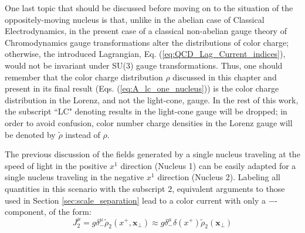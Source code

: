 One last topic that should be discussed before moving on to the situation of the oppositely-moving nucleus is that, unlike in the abelian case of Classical Electrodynamics, in the present case of a classical non-abelian gauge theory of Chromodynamics gauge transformations alter the distributions of color charge; otherwise, the introduced Lagrangian, Eq. (\ref{eq:QCD_Lag_Current_indices}), would not be invariant under SU(3) gauge transformations. Thus, one should remember that the color charge distribution $\rho$ discussed in this chapter and present in its final result (Eqs. (\ref{eq:A_lc_one_nucleus})) is the color charge distribution in the Lorenz, and not the light-cone, gauge. In the rest of this work, the subscript ``LC" denoting results in the light-cone gauge will be dropped; in order to avoid confusion, color number charge densities in the Lorenz gauge will be denoted by $\tilde{\rho}$ instead of $\rho$.

\bigskip
The previous discussion of the fields generated by a single nucleus traveling at the speed of light in the positive $x^1$ direction (Nucleus 1) can be easily adapted for a single nucleus traveling in the negative $x^1$ direction (Nucleus 2). Labeling all quantities in this scenario with the subscript $2$, equivalent arguments to those used in Section \ref{sec:scale_separation} lead to a color current with only a $-$-component, of the form:
\begin{equation}
	J_2^\mu = g \delta^{\mu}_- \tilde{\rho}_2(x^+,\mathbf{x}_\perp) \approx g \delta^{\mu}_- \delta (x^+) \tilde{\rho}_2(\mathbf{x}_\perp)
\end{equation}

